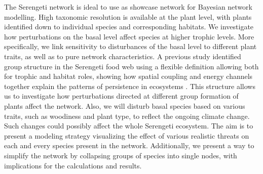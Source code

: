 \documentclass[a4paper,11pt]{article}
\begin{document}
The Serengeti network is ideal to use as showcase network for Bayesian network modelling. High taxonomic resolution is available at the plant level, with plants identified down to individual species and corresponding habitats. We investigate how perturbations on the basal level affect species at higher trophic levels. More specifically, we link sensitivity to disturbances of the basal level to different plant traits, as well as to pure network characteristics.  A previous study identified group structure in the Serengeti food web using a flexible definition allowing both for trophic and habitat roles, showing how spatial coupling and energy channels together explain the patterns of persistence in ecosystems \cite{Baskervilleetal2011}. This structure allows us to investigate how perturbations directed at different group formation of plants affect the network. Also, we will disturb basal species based on various traits, such as woodiness and plant type, to reflect the ongoing climate change. Such changes could possibly affect the whole Serengeti ecosystem. The aim is to present a modeling strategy visualizing the effect of various realistic threats on each and every species present in the network. Additionally, we present a way to simplify the network by collapsing groups of species into single nodes, with implications for the calculations and results. 
\end{document}
